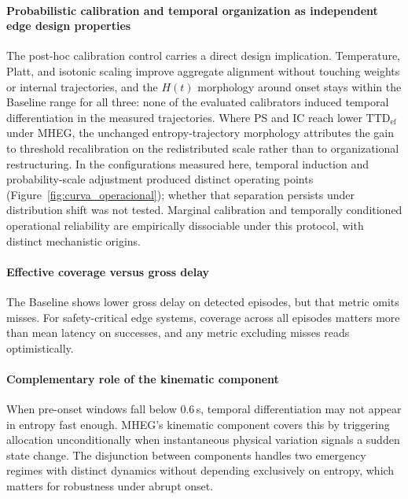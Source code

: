 \documentclass[a4paper,fleqn]{cas-dc}
\newcommand{\MHEG}{\mbox{MHEG}\xspace}
\begin{document}
\paragraph{Probabilistic calibration and temporal organization as
independent edge design properties}
The post-hoc calibration control carries a direct design implication.
Temperature, Platt, and isotonic scaling improve aggregate alignment without
touching weights or internal trajectories, and the $H(t)$ morphology around
onset stays within the Baseline range for all three: none of the evaluated
calibrators induced temporal differentiation in the measured trajectories. Where PS and IC reach lower
$\mathrm{TTD}_{\mathrm{ef}}$ under \MHEG, {\color{\revcolor}the unchanged
entropy-trajectory morphology} attributes the gain to threshold recalibration on
the redistributed scale rather than to organizational restructuring. {\color{\revcolor}In the configurations measured here, temporal induction
and probability-scale adjustment produced distinct operating points
(Figure~\ref{fig:curva_operacional}); whether that separation persists under
distribution shift was not tested.}
Marginal calibration and temporally conditioned operational reliability are
empirically dissociable under this protocol, with distinct mechanistic origins.
\paragraph{Effective coverage versus gross delay}
The Baseline shows lower gross delay on detected episodes, but that metric omits
misses. For safety-critical edge systems, coverage across all episodes matters
more than mean latency on successes, and any metric excluding misses reads
optimistically.
\paragraph{Complementary role of the kinematic component}
When pre-onset windows fall below 0.6\,s, temporal differentiation may not
appear in entropy fast enough. \MHEG's kinematic component covers this by
triggering allocation unconditionally when instantaneous physical variation
signals a sudden state change. The disjunction between components handles two
emergency regimes with distinct dynamics without depending exclusively on
entropy, which matters for robustness under abrupt onset.
\end{document}
